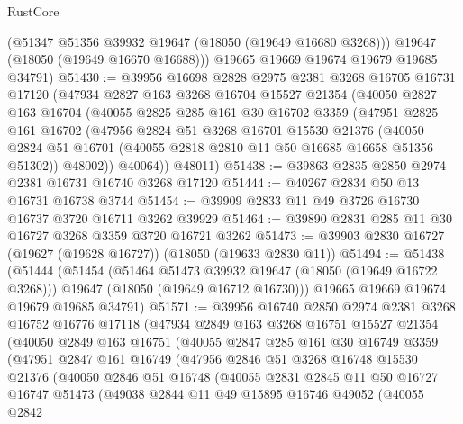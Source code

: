 \begin{lexlean}{RustCore}
\begin{coremodule}
        (@51347 @51356 @39932 @19647 (@18050 (@19649 @16680 @3268)))
        @19647
        (@18050 (@19649 @16670 @16688)))
      @19665
      @19669
      @19674
      @19679
      @19685
      @34791)
@51430 := @39956
    @16698
    @2828
    @2975
    @2381
    @3268
    @16705
    @16731
    @17120
    (@47934
      @2827
      @163
      @3268
      @16704
      @15527
      @21354
      (@40050
        @2827
        @163
        @16704
        (@40055
          @2825
          @285
          @161
          @30
          @16702
          @3359
          (@47951
            @2825
            @161
            @16702
            (@47956
              @2824
              @51
              @3268
              @16701
              @15530
              @21376
              (@40050 @2824 @51 @16701 (@40055 @2818 @2810 @11 @50 @16685 @16658 @51356 @51302))
              @48002))
          @40064))
      @48011)
@51438 := @39863 @2835 @2850 @2974 @2381 @16731 @16740 @3268 @17120
@51444 := @40267 @2834 @50 @13 @16731 @16738 @3744
@51454 := @39909 @2833 @11 @49 @3726 @16730 @16737 @3720 @16711 @3262 @39929
@51464 := @39890 @2831 @285 @11 @30 @16727 @3268 @3359 @3720 @16721 @3262
@51473 := @39903 @2830 @16727 (@19627 (@19628 @16727)) (@18050 (@19633 @2830 @11))
@51494 := @51438
    (@51444
      (@51454
        (@51464 @51473 @39932 @19647 (@18050 (@19649 @16722 @3268)))
        @19647
        (@18050 (@19649 @16712 @16730)))
      @19665
      @19669
      @19674
      @19679
      @19685
      @34791)
@51571 := @39956
    @16740
    @2850
    @2974
    @2381
    @3268
    @16752
    @16776
    @17118
    (@47934
      @2849
      @163
      @3268
      @16751
      @15527
      @21354
      (@40050
        @2849
        @163
        @16751
        (@40055
          @2847
          @285
          @161
          @30
          @16749
          @3359
          (@47951
            @2847
            @161
            @16749
            (@47956
              @2846
              @51
              @3268
              @16748
              @15530
              @21376
              (@40050
                @2846
                @51
                @16748
                (@40055
                  @2831
                  @2845
                  @11
                  @50
                  @16727
                  @16747
                  @51473
                  (@49038
                    @2844
                    @11
                    @49
                    @15895
                    @16746
                    @49052
                    (@40055
                      @2842

\end{coremodule}
\end{lexlean}
